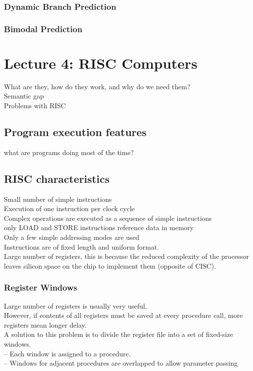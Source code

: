 \documentclass[titlepage, a4paper]{article}
\begin{document}
\subsubsection{Dynamic Branch Prediction}
\subsubsection{Bimodal Prediction}

\section{Lecture 4: RISC Computers}
What are they, how do they work, and why do we need them? \\
Semantic gap \\
Problems with RISC \\

\subsection{Program execution features}
what are programs doing most of the time?

\subsection{RISC characteristics}
Small number of simple instructions \\
Execution of one instruction per clock cycle \\
Complex operations are executed as a sequence of simple instructions \\
only LOAD and STORE instructions reference data in memory \\
Only a few simple addressing modes are used \\
Instructions are of fixed length and uniform format. \\
Large number of registers, this is because the reduced complexity of the processor leaves silicon space on the chip to implement them (opposite of CISC).
\subsubsection{Register Windows}
Large number of registers is usually very useful. \\
However, if contents of all registers must be saved at every procedure call, more registers mean longer delay. \\
A solution to this problem is to divide the register file into a
set of fixed-size windows. \\
-- Each window is assigned to a procedure. \\
-- Windows for adjacent procedures are overlapped to allow parameter passing \\
\end{document}
